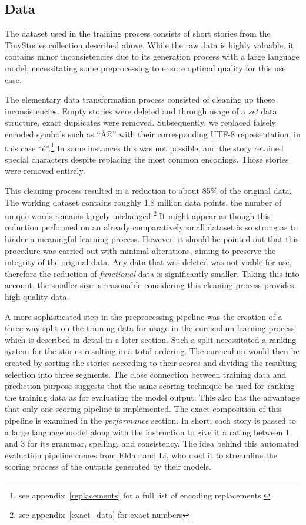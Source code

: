 \documentclass[11pt]{article}
\begin{document}
    \subsection*{Data}
    The dataset used in the training process consists of short stories from the TinyStories collection described above.
    While the raw data is highly valuable, it contains minor inconsistencies due to its generation process with a large language model,
    necessitating some preprocessing to ensure optimal quality for this use case.

    The elementary data transformation process consisted of cleaning up those inconsistencies.
    Empty stories were deleted and through usage of a \textit{set} data structure, exact duplicates were removed.
    Subsequently, we replaced falsely encoded symbols such as “Ã©” with their corresponding UTF-8 representation, in this case “é”.\footnote{see appendix~\ref{replacements} for a full list of encoding replacements.}
    In some instances this was not possible, and the story retained special characters despite replacing the most common encodings. Those stories were removed entirely.

    This cleaning process resulted in a reduction to about 85\% of the original data. The working dataset contains roughly 1.8 million data points, the number of unique words remains largely unchanged.\footnote{see appendix~\ref{exact_data} for exact numbers}
    It might appear as though this reduction performed on an already comparatively small dataset is so strong as to hinder a meaningful
    learning process. However, it should be pointed out that this procedure
    was carried out with minimal alterations, aiming to preserve the integrity of the original data.
    Any data that was deleted was not viable for use, therefore the reduction of \textit{functional}
    data is significantly smaller.
    Taking this into account, the smaller size is reasonable
    considering this cleaning process provides high-quality data.

    A more sophisticated step in the preprocessing pipeline was the creation of a three-way split on the training data for usage in the curriculum learning process which is described in detail in a later section.
    Such a split necessitated a ranking system for the stories resulting in a total ordering. The curriculum would then be created by sorting the stories according to their scores and dividing the resulting selection into three segments.
    The close connection between training data and prediction purpose
    suggests that the same scoring technique be used for ranking the training data as for evaluating the model output. This also has the advantage that only one scoring pipeline is implemented.
    The exact composition of this pipeline is examined
    in the \textit{performance} section. In short, each story is passed to a large language model along with the instruction to give it a rating between 1 and 3 for its grammar, spelling, and consistency.
    The idea behind this automated evaluation pipeline comes from Eldan and Li, who used it to streamline the scoring process of the outputs generated by their models. \cite{tinystories}
\end{document}
